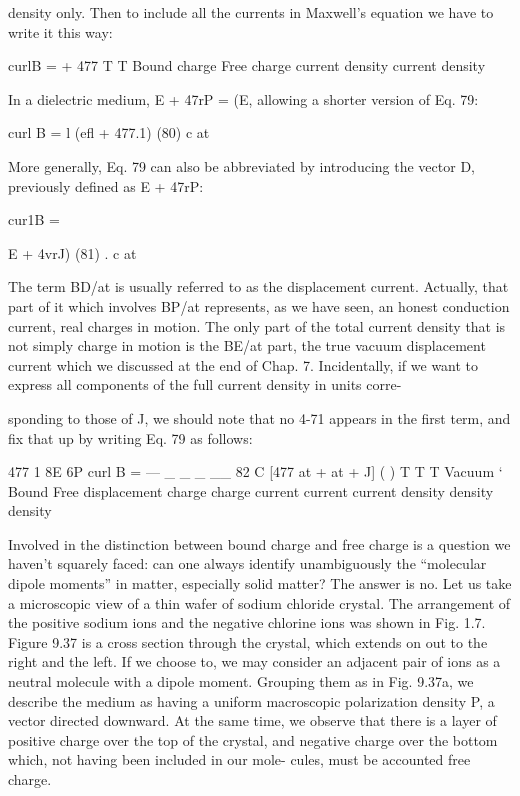 {{density only. Then to include all the currents in Maxwell's equation
we have to write it this way:

\begin{equation}
\end{equation}
curlB =  + 477%
T T
Bound charge Free charge
current density current density

In a dielectric medium, E + 47rP = (E, allowing a shorter version
of Eq. 79:

\begin{equation}
\end{equation}
curl B = l (efl + 477.1) (80)
c at

More generally, Eq. 79 can also be abbreviated by introducing the
vector D, previously defined as E + 47rP:

\begin{equation}
\end{equation}
cur1B = {E + 4vrJ) (81)
. c at

The term BD/at is usually referred to as the displacement current.
Actually, that part of it which involves BP/at represents, as we have
seen, an honest conduction current, real charges in motion. The
only part of the total current density that is not simply charge in
motion is the BE/at part, the true vacuum displacement current
which we discussed at the end of Chap. 7. Incidentally, if we want
to express all components of the full current density in units corre-

sponding to those of J, we should note that no 4-71 appears in the first
term, and fix that up by writing Eq. 79 as follows:

\begin{equation}
\end{equation}
477 1 8E 6P
curl B =  --- _ _ _ __ 82
C [477 at + at + J] ( )
T T T
Vacuum ‘ Bound Free
displacement charge charge
current current current
density density density

Involved in the distinction between bound charge and free charge
is a question we haven't squarely faced: can one always identify
unambiguously the ``molecular dipole moments'' in matter, especially
solid matter? The answer is no. Let us take a microscopic view of
a thin wafer of sodium chloride crystal. The arrangement of the
positive sodium ions and the negative chlorine ions was shown in
Fig. 1.7. Figure 9.37 is a cross section through the crystal, which
extends on out to the right and the left. If we choose to, we may
consider an adjacent pair of ions as a neutral molecule with a dipole
moment. Grouping them as in Fig. 9.37a, we describe the medium
as having a uniform macroscopic polarization density P, a vector
directed downward. At the same time, we observe that there is a
layer of positive charge over the top of the crystal, and negative
charge over the bottom which, not having been included in our mole-
cules, must be accounted free charge.

}}}
